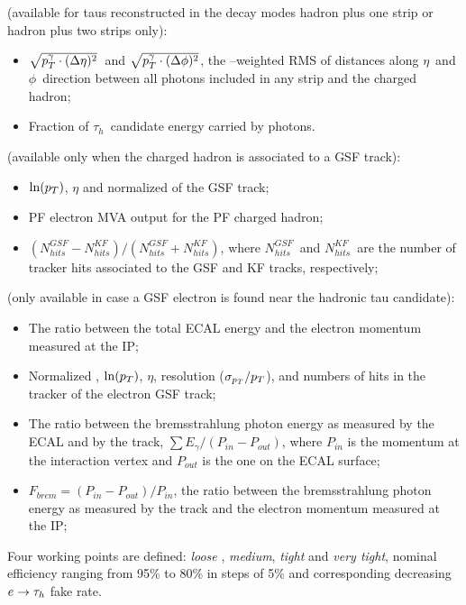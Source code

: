  (available for taus reconstructed in the decay modes hadron plus one strip or hadron plus two strips only):
\begin{itemize}
\item $\sqrt{p_{T}^{\gamma} \cdot (\Delta\eta)^{2}}$\ and $\sqrt{p_{T}^{\gamma} \cdot (\Delta\phi)^{2}}$, 
  the \pT--weighted RMS of distances along $\eta$\ and $\phi$\ direction between all photons included in any strip and the charged hadron;
\item Fraction of $\tau_{h}$\ candidate energy carried by photons.
\end{itemize}

 (available only when the charged hadron is associated to a GSF track):
\begin{itemize}
\item $\ln (p_{T})$, $\eta$ and normalized \chisq of the GSF track;
\item PF electron MVA output for the PF charged hadron;
\item $(N_{hits}^{GSF} - N_{hits}^{KF})/(N_{hits}^{GSF} + N_{hits}^{KF})$, where $N_{hits}^{GSF}$\ and $N_{hits}^{KF}$\ are the number of tracker hits associated to the GSF and KF tracks, respectively;
\end{itemize}

 (only available in case a GSF electron is found near the hadronic tau candidate):
\begin{itemize}
\item The ratio between the total ECAL energy and the electron momentum measured at the IP;
\item Normalized \chisq, $\ln (p_{T})$, $\eta$, \pT resolution ($\sigma_{p_{T}}/p_{T}$), and numbers of hits in the tracker of the electron GSF track;
\item The ratio between the bremsstrahlung photon energy as measured by the ECAL and by the track, $\sum E_{\gamma}/(P_{in}-P_{out})$, where $P_{in}$ is the momentum at the interaction vertex and $P_{out}$ is the one on the ECAL surface;
\item $F_{brem}=(P_{in}-P_{out})/P_{in}$, the ratio between the bremsstrahlung photon energy as measured by the track and the electron momentum measured at the IP;
\end{itemize}

Four working points are defined: \emph{loose }, \emph{medium}, \emph{tight} and \emph{very tight}, nominal efficiency ranging from 95\% to 80\% in steps of 5\% and corresponding decreasing $e \rightarrow \tau_h$ fake rate. %

